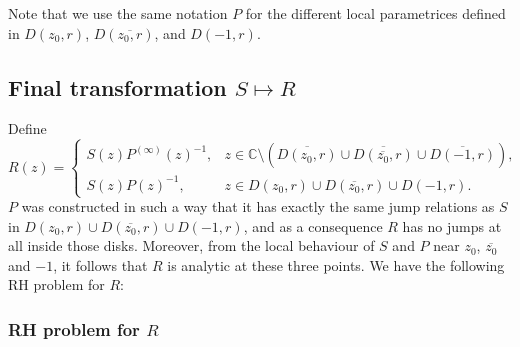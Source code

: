 \documentclass[11pt,fleqn]{article}
\numberwithin{equation}{section}
\begin{document}
Note that we use the same notation $P$ for the different local parametrices defined in $D(z_0,r)$, $D(\overline{z_0,r})$, and $D(-1,r)$.


\subsection{Final transformation $S\mapsto R$}


Define
\begin{equation}\label{R}
R(z)=\begin{cases}
S(z)P^{(\infty)}(z)^{-1},&z\in\mathbb C\setminus(\overline{D(z_0,r)}\cup\overline{D(\overline{z_0},r)}\cup\overline{D(-1,r)}),\\
S(z)P(z)^{-1}, & z\in D(z_0,r)\cup D(\overline{z_0},r)\cup D(-1,r).
\end{cases}
\end{equation}
$P$ was constructed in such a way that it has exactly the same jump relations as $S$ in $D(z_0,r)\cup D(\overline{z_0},r)\cup D(-1,r)$, and as a consequence $R$ has no jumps at all inside those disks. Moreover, from the local behaviour of $S$ and $P$ near $z_0$, $\overline{z_0}$ and $-1$, it follows that $R$ is analytic at these three points.
We have the following RH problem for $R$:
\subsubsection*{RH problem for $R$}

\end{document}

